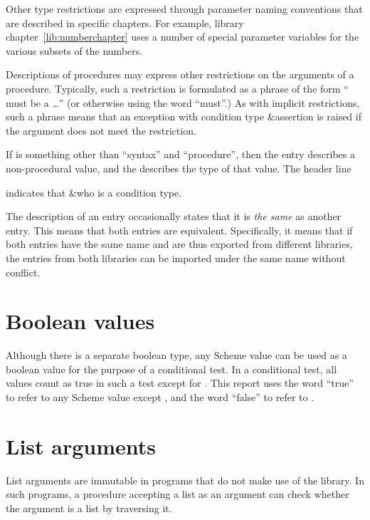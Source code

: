 Other type restrictions are expressed through parameter naming
conventions that are described in specific chapters.  For
example, library chapter~\ref{lib:numberchapter} uses a number of special parameter
variables for the various subsets of the numbers.

Descriptions of procedures may express other restrictions on the
arguments of a procedure.  Typically, such a restriction is formulated
as a phrase of the form `` must be a \ldots'' (or otherwise
using the word ``must''.)  As with
implicit restrictions, such a phrase means that an exception with
condition type {\cf\&assertion} is raised if the argument does not
meet the restriction.

If  is something other than ``syntax'' and
``procedure'', then the entry describes a non-procedural value, and
the  describes the type of that value.  The header line

\noindent{}

indicates that {\cf\&who} is a condition type.

The description of an entry occasionally states that it is \textit{the
  same} as another entry.  This means that both entries are
equivalent.  Specifically, it means that if both entries have the same
name and are thus exported from different libraries, the entries from
both libraries can be imported under the same name without conflict.

\section{Boolean values}
\label{booleanvaluessection}

Although there is a separate boolean type, any Scheme value can be
used as a boolean value for the purpose of a conditional test.  In a
conditional test, all values count as true in such a test except for
\schfalse{}.  This report uses the word ``true'' to refer to any
Scheme value except \schfalse{}, and the word ``false'' to refer to
\schfalse{}.  

\section{List arguments}
\label{listargumentssection}

List arguments are immutable in programs that do not make use of the
 library.  In such programs, a procedure accepting a list as an
argument can check whether the argument is a list by traversing it.

